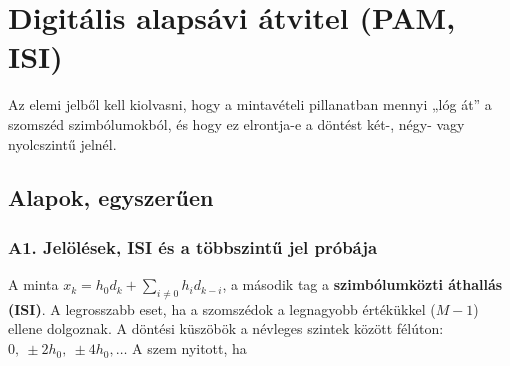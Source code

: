 \setcounter{chapter}{5}
\chapter{\texorpdfstring{Digitális alapsávi átvitel (PAM, ISI)}{Digitális alapsávi átvitel (PAM, ISI)}}\label{f6}
Az elemi jelből kell kiolvasni, hogy a mintavételi pillanatban mennyi „lóg át” a szomszéd szimbólumokból, és hogy ez elrontja-e a döntést két-, négy- vagy nyolcszintű jelnél.

\section{Alapok, egyszerűen}
\subsection{\texorpdfstring{A1. Jelölések, ISI és a többszintű jel próbája}{A1. Jelölések, ISI és a többszintű jel próbája}}\label{a6-isi}
\par{}\par

A minta $x_k=h_0d_k+\sum_{i\ne0}h_id_{k-i}$, a második tag a \textbf{szimbólumközti áthallás (ISI)}. A legrosszabb eset, ha a szomszédok a legnagyobb értékükkel ($M-1$) ellene dolgoznak. A döntési küszöbök a névleges szintek között félúton: $0,\ \pm2h_0,\ \pm4h_0,\ldots$ A szem nyitott, ha

\begin{center}\end{center}

